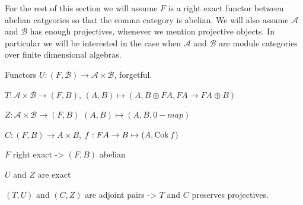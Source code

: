For the rest of this section we will assume $F$ is a right exact functor between abelian catgeories so that the comma category is abelian. We will also assume $\mathcal A$ and $\mathcal B$ has enough projectives, whenever we mention projective objects. In particular we will be interested in the case when $\mathcal A$ and $\mathcal B$ are module categories over finite dimensional algebras.

Functors $U: (F, \mathcal B) \to \mathcal A \times \mathcal{B}$, forgetful.

$T: \mathcal A \times \mathcal{B} \to (F, B)$, $(A, B) \mapsto (A, B \oplus FA, FA \to FA \oplus B)$

$Z: \mathcal A \times \mathcal{B} \to (F, B)$ $(A,B) \mapsto (A, B, 0-map)$

$C: (F, B) \to A\times B$, $f:FA \to B \mapsto (A, \operatorname{Cok} f)$

$F$ right exact -> $(F, B)$ abelian

$U$ and $Z$ are exact

$(T, U)$ and $(C, Z)$ are adjoint pairs -> $T$ and $C$ preserves projectives.

